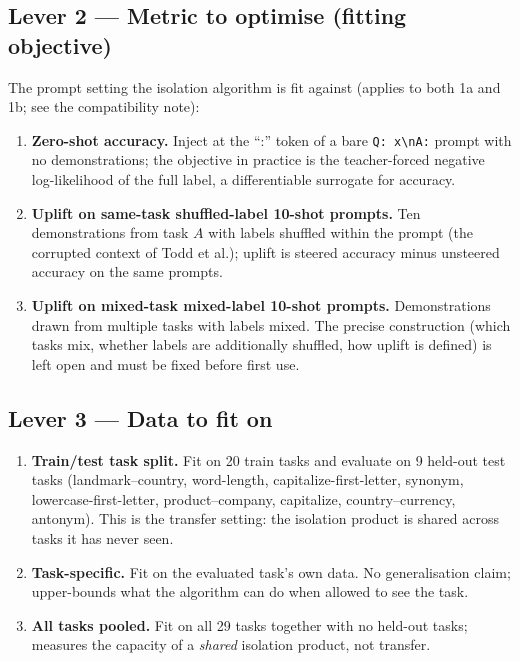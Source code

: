 \documentclass[
]{article}
\providecommand{\tightlist}{%
  \setlength{\itemsep}{0pt}\setlength{\parskip}{0pt}}
\begin{document}
\subsection{Lever 2 — Metric to optimise (fitting objective)}\label{lever-2-metric-to-optimise}

The prompt setting the isolation algorithm is fit against (applies to both 1a and
1b; see the compatibility note):

\begin{enumerate}
\tightlist
\item
  \textbf{Zero-shot accuracy.} Inject at the ``:'' token of a bare
  \texttt{Q:\ x\textbackslash nA:} prompt with no demonstrations; the objective in
  practice is the teacher-forced negative log-likelihood of the full label, a
  differentiable surrogate for accuracy.
\item
  \textbf{Uplift on same-task shuffled-label 10-shot prompts.} Ten demonstrations
  from task \(A\) with labels shuffled within the prompt (the corrupted context of
  Todd et al.); uplift is steered accuracy minus unsteered accuracy on the same
  prompts.
\item
  \textbf{Uplift on mixed-task mixed-label 10-shot prompts.} Demonstrations drawn
  from multiple tasks with labels mixed. The precise construction (which tasks mix,
  whether labels are additionally shuffled, how uplift is defined) is left open and
  must be fixed before first use.
\end{enumerate}

\subsection{Lever 3 — Data to fit on}\label{lever-3-data-to-fit-on}

\begin{enumerate}
\tightlist
\item
  \textbf{Train/test task split.} Fit on 20 train tasks and evaluate on 9 held-out
  test tasks (landmark--country, word-length, capitalize-first-letter, synonym,
  lowercase-first-letter, product--company, capitalize, country--currency, antonym).
  This is the transfer setting: the isolation product is shared across tasks it has
  never seen.
\item
  \textbf{Task-specific.} Fit on the evaluated task's own data. No generalisation
  claim; upper-bounds what the algorithm can do when allowed to see the task.
\item
  \textbf{All tasks pooled.} Fit on all 29 tasks together with no held-out tasks;
  measures the capacity of a \emph{shared} isolation product, not transfer.
\end{enumerate}
\end{document}
